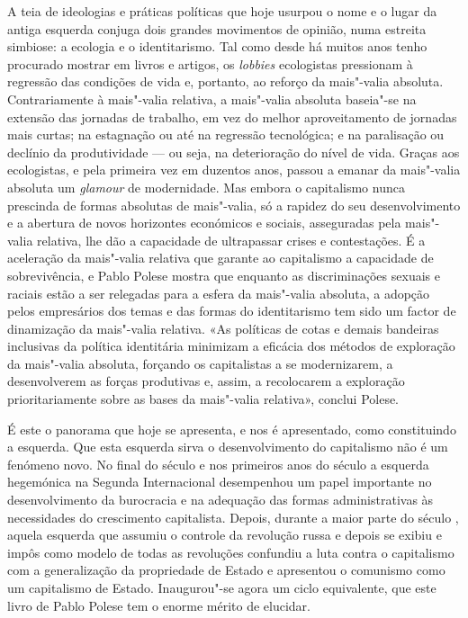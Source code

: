 A teia de ideologias e práticas políticas que hoje usurpou o nome e o
lugar da antiga esquerda conjuga dois grandes movimentos de opinião,
numa estreita simbiose: a ecologia e o identitarismo. Tal como desde há
muitos anos tenho procurado mostrar em livros e artigos, os
\emph{lobbies} ecologistas pressionam à regressão das condições de vida
e, portanto, ao reforço da mais"-valia absoluta. Contrariamente à
mais"-valia relativa, a mais"-valia absoluta baseia"-se na extensão das
jornadas de trabalho, em vez do melhor aproveitamento de jornadas mais
curtas; na estagnação ou até na regressão tecnológica; e na paralisação
ou declínio da produtividade --- ou seja, na deterioração do nível de
vida. Graças aos ecologistas, e pela primeira vez em duzentos anos,
passou a emanar da mais"-valia absoluta um \emph{glamour} de modernidade.
Mas embora o capitalismo nunca prescinda de formas absolutas de
mais"-valia, só a rapidez do seu desenvolvimento e a abertura de novos
horizontes económicos e sociais, asseguradas pela mais"-valia relativa,
lhe dão a capacidade de ultrapassar crises e contestações. É a
aceleração da mais"-valia relativa que garante ao capitalismo a
capacidade de sobrevivência, e Pablo Polese mostra que enquanto as
discriminações sexuais e raciais estão a ser relegadas para a esfera da
mais"-valia absoluta, a adopção pelos empresários dos temas e das formas
do identitarismo tem sido um factor de dinamização da mais"-valia
relativa. «As políticas de cotas e demais bandeiras inclusivas da
política identitária minimizam a eficácia dos métodos de exploração da
mais"-valia absoluta, forçando os capitalistas a se modernizarem, a
desenvolverem as forças produtivas e, assim, a recolocarem a exploração
prioritariamente sobre as bases da mais"-valia relativa», conclui Polese.

É este o panorama que hoje se apresenta, e nos é apresentado, como
constituindo a esquerda. Que esta esquerda sirva o desenvolvimento do
capitalismo não é um fenómeno novo. No final do século  e nos
primeiros anos do século  a esquerda hegemónica na Segunda
Internacional desempenhou um papel importante no desenvolvimento da
burocracia e na adequação das formas administrativas às necessidades do
crescimento capitalista. Depois, durante a maior parte do século ,
aquela esquerda que assumiu o controle da revolução russa e depois se
exibiu e impôs como modelo de todas as revoluções confundiu a luta
contra o capitalismo com a generalização da propriedade de Estado e
apresentou o comunismo como um capitalismo de Estado. Inaugurou"-se agora
um ciclo equivalente, que este livro de Pablo Polese tem o enorme mérito
de elucidar.



